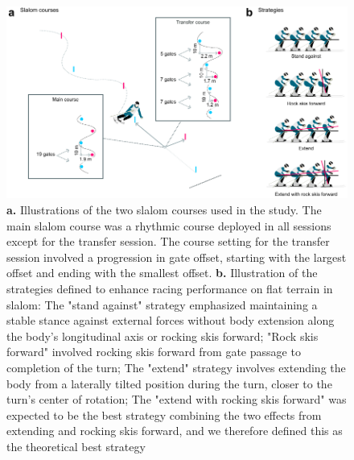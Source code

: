 \documentclass[pdflatex,sn-nature]{sn-jnl}%
\theoremstyle{thmstyleone}%
\theoremstyle{thmstyletwo}%
\theoremstyle{thmstylethree}%
\begin{document}
\begin{figure}[H]
\centering
\includegraphics{figures/figure_method_courseandstrategy.pdf}
\caption{\textbf{a.} Illustrations of the two slalom courses used in the study. The main slalom course was a rhythmic course deployed in all sessions except for the transfer session. The course setting for the transfer session involved a progression in gate offset, starting with the largest offset and ending with the smallest offset. \textbf{b.} Illustration of the strategies defined to enhance racing performance on flat terrain in slalom: The "stand against" strategy emphasized maintaining a stable stance against external forces without body extension along the body's longitudinal axis or rocking skis forward; "Rock skis forward" involved rocking skis forward from gate passage to completion of the turn; The "extend" strategy involves extending the body from a laterally tilted position during the turn, closer to the turn's center of rotation; The "extend with rocking skis forward" was expected to be the best strategy combining the two effects from extending and rocking skis forward, and we therefore defined this as the theoretical best strategy}
\label{fig:courseandstrategies}
\end{figure}
\end{document}
